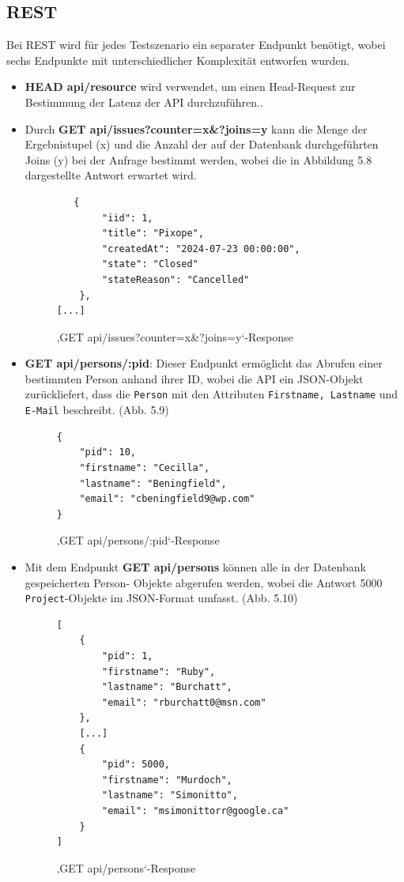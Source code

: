 \subsection{REST}
\label{sec:rest}
Bei REST wird für jedes Testszenario ein separater Endpunkt benötigt, wobei sechs Endpunkte mit unterschiedlicher Komplexität entworfen wurden.

\begin{itemize}
\item \colorbox{gray!20}{\textbf{HEAD api/resource}} wird verwendet, um einen Head-Request zur Bestimmung der Latenz der API durchzuführen..
\item Durch \colorbox{gray!20}{\textbf{GET api/issues?counter=x\&?joins=y}} kann die Menge der Ergebnistupel (x) und die Anzahl der auf der Datenbank durchgeführten Joins (y) bei der Anfrage bestimmt werden, wobei die in Abbildung 5.8 dargestellte Antwort erwartet wird.
\begin{figure}[H]
\begin{center}
\begin{BVerbatim}
   {
        "iid": 1,
        "title": "Pixope",
        "createdAt": "2024-07-23 00:00:00",
        "state": "Closed"
        "stateReason": "Cancelled"
    },
[...]
\end{BVerbatim}
\end{center}
\caption{‚GET api/issues?counter=x\&?joins=y‘-Response}
\end{figure}


\item \colorbox{gray!20}{\textbf{GET api/persons/:pid}}: Dieser Endpunkt ermöglicht das Abrufen einer bestimmten Person anhand ihrer ID, wobei die API ein JSON-Objekt zurückliefert, dass die \texttt{Person} mit den Attributen \texttt{Firstname, Lastname} und \texttt{E-Mail} beschreibt. (Abb. 5.9)
\begin{figure}[H]
\begin{center}
\begin{BVerbatim}
{
    "pid": 10,
    "firstname": "Cecilla",
    "lastname": "Beningfield",
    "email": "cbeningfield9@wp.com"
}
\end{BVerbatim}
\end{center}
\caption{‚GET api/persons/:pid‘-Response}
\end{figure}

\item Mit dem Endpunkt  \colorbox{gray!20}{\textbf{GET api/persons}} können alle in der Datenbank gespeicherten Person- Objekte abgerufen werden, wobei die Antwort 5000  \texttt{Project}-Objekte im JSON-Format umfasst. (Abb. 5.10)
\begin{figure}[H]
\begin{center}
\begin{BVerbatim}
[
    {
        "pid": 1,
        "firstname": "Ruby",
        "lastname": "Burchatt",
        "email": "rburchatt0@msn.com"
    },
	[...]
    {
        "pid": 5000,
        "firstname": "Murdoch",
        "lastname": "Simonitto",
        "email": "msimonittorr@google.ca"
    }
]
\end{BVerbatim}
\end{center}
\caption{‚GET api/persons‘-Response}
\end{figure}


\end{itemize}
